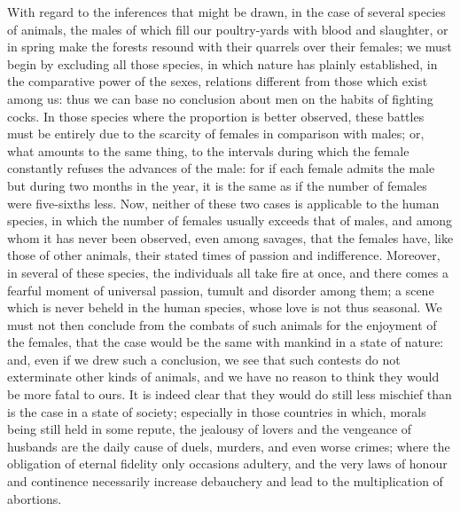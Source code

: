 \documentclass[12pt]{report}
\begin{document}
With regard to the inferences that might be drawn, in the case of several species of animals, the males of which fill our poultry-yards with blood and slaughter, or in spring make the forests resound with their quarrels over their females; we must begin by excluding all those species, in which nature has plainly established, in the comparative power of the sexes, relations different from those which exist among us: thus we can base no conclusion about men on the habits of fighting cocks. In those species where the proportion is better observed, these battles must be entirely due to the scarcity of females in comparison with males; or, what amounts to the same thing, to the intervals during which the female constantly refuses the advances of the male: for if each female admits the male but during two months in the year, it is the same as if the number of females were five-sixths less. Now, neither of these two cases is applicable to the human species, in which the number of females usually exceeds that of males, and among whom it has never been observed, even among savages, that the females have, like those of other animals, their stated times of passion and indifference. Moreover, in several of these species, the individuals all take fire at once, and there comes a fearful moment of universal passion, tumult and disorder among them; a scene which is never beheld in the human species, whose love is not thus seasonal. We must not then conclude from the combats of such animals for the enjoyment of the females, that the case would be the same with mankind in a state of nature: and, even if we drew such a conclusion, we see that such contests do not exterminate other kinds of animals, and we have no reason to think they would be more fatal to ours. It is indeed clear that they would do still less mischief than is the case in a state of society; especially in those countries in which, morals being still held in some repute, the jealousy of lovers and the vengeance of husbands are the daily cause of duels, murders, and even worse crimes; where the obligation of eternal fidelity only occasions adultery, and the very laws of honour and continence necessarily increase debauchery and lead to the multiplication of abortions.
\end{document}
